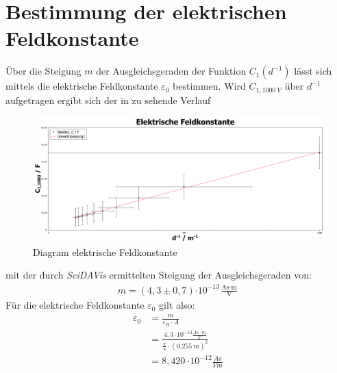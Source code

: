 \section{Bestimmung der elektrischen Feldkonstante}
Über die Steigung $ m $ der Ausgleichsgeraden der Funktion $ C_{1}(d^{-1}) $ lässt sich mittels  die
elektrische Feldkonstante $\varepsilon_0$ bestimmen. Wird $ C_{1,\SI{1000}{V}} $ über $ d^{-1} $ aufgetragen ergibt sich
der in  zu sehende Verlauf\par
\begin{figure}[h]
    \centering
    \includegraphics[width=.95\textwidth]{diagramme/Elektrische_Feldkonstante.pdf}
    \caption[Diagram elektrische Feldkonstante]{Diagram elektrische Feldkonstante}
    \label{fig:mu_0}
\end{figure}
%
mit der durch \textit{SciDAVis} ermittelten Steigung der Ausgleichsgeraden von:
%
\begin{align}
    m=(4,3 \pm 0,7){\cdot 10^{-13}\frac{\text{As}\cdot \text{m}}{\text{V}}}
\end{align}
Für die elektrische Feldkonstante $\varepsilon_{0}$ gilt also:
\begin{align}
    \varepsilon_{0} &= \frac{m}{\varepsilon_{R}\cdot A} \nonumber \\
    &= \frac{4,3\SI{}{\cdot 10^{-13} \frac{As \cdot m}{V}}}{ \frac{\pi}{4} \cdot (\SI{0,255}{m})^{2} } \nonumber \\
    &= 8,420\SI{}{\cdot 10^{-12}\frac{As}{Vm}}
\end{align}
%
